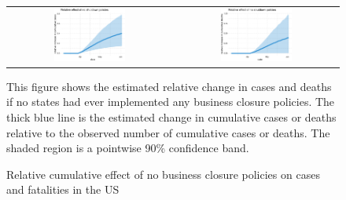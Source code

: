 \documentclass[11pt,reqno,letter]{amsart}
\theoremstyle{definition}
\begin{document}
\begin{figure}[ht]
  \caption{Relative cumulative effect  of no business closure policies on cases and fatalities in the US  \label{fig:US-nb-dgrowth}}
  \begin{minipage}{\linewidth}
    \centering
    \begin{tabular}{cc}
%
      \includegraphics[width=0.45\textwidth]{tables_and_figures/us-index-rcumu_idx}
      & \includegraphics[width=0.45\textwidth]{tables_and_figures/us-index-rcumu_deaths_idx}
    \end{tabular}
    \begin{flushleft}
      \footnotesize This figure shows the estimated relative change in
      cases and deaths if no states had ever implemented any business closure
      policies. The thick blue line is the estimated change in cumulative
      cases or deaths relative to the observed number of cumulative cases
      or deaths. The shaded region is a pointwise 90\% confidence
      band.
    \end{flushleft}
  \end{minipage}
\end{figure}
\end{document}
